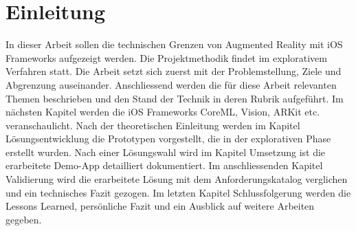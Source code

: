\section{Einleitung}

In dieser Arbeit sollen die technischen Grenzen von Augmented Reality mit iOS Frameworks aufgezeigt werden. Die Projektmethodik findet im explorativem Verfahren statt. 
Die Arbeit setzt sich zuerst mit der Problemstellung, Ziele und Abgrenzung auseinander. Anschliessend werden die für diese Arbeit relevanten Themen beschrieben und den Stand der Technik in deren Rubrik aufgeführt. Im nächsten Kapitel werden die iOS Frameworks CoreML, Vision, ARKit etc. veranschaulicht. Nach der theoretischen Einleitung werden im Kapitel Lösungsentwicklung die Prototypen vorgestellt, die in der explorativen Phase erstellt wurden. Nach einer Lösungswahl wird im Kapitel Umsetzung ist die erarbeitete Demo-App detailliert dokumentiert. Im anschliessenden Kapitel Validierung wird die erarbeitete Lösung mit dem Anforderungskatalog verglichen und ein technisches Fazit gezogen. Im letzten Kapitel Schlussfolgerung werden die Lessons Learned, persönliche Fazit und ein Ausblick auf weitere Arbeiten gegeben.

